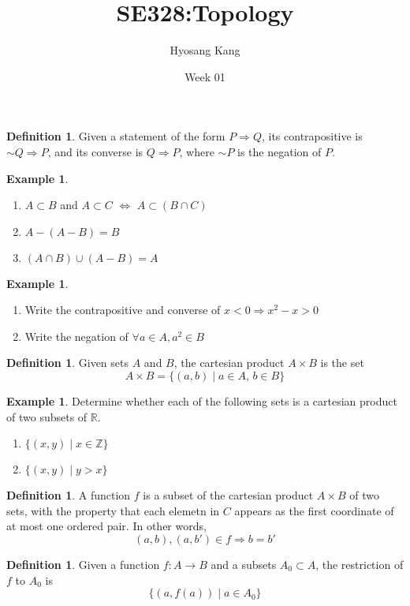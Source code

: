 \documentclass{beamer}
\title[]{SE328:Topology}
\author[]{Hyosang Kang\inst{1}}
\institute[]{\inst{1}Division of Mathematics\\ School of Interdisciplinary Studies\\ DGIST}
\date[]{Week 01}
\theoremstyle{plain}
\theoremstyle{definition}
\newtheorem{defn}[thm]{Definition}
\newtheorem{exmp}[thm]{Example}
\begin{document}
\begin{frame}
\titlepage
\end{frame}

\begin{frame}
\begin{defn}
	Given a statement of the form $P\Rightarrow Q$,
	its contrapositive is $\sim Q\Rightarrow P$,
	and its converse is $Q\Rightarrow P$,
	where $\sim P$ is the negation of $P$.
\end{defn}
\begin{exmp}
	\begin{enumerate}
		\item $A\subset B$ and $A\subset C$ 
		$\Leftrightarrow$ $A\subset(B\cap C)$
		\item $A - (A - B) = B$
		\item $(A\cap B)\cup (A-B) = A$
	\end{enumerate}
\end{exmp}
\begin{exmp}
	\begin{enumerate}
		\item Write the contrapositive and 
		converse of $x<0\Rightarrow x^2-x>0$
		\item Write the negation of
		$\forall a\in A, a^2\in B$
	\end{enumerate}
\end{exmp}
\end{frame}

\begin{frame}
\begin{defn}
	Given sets $A$ and $B$, the cartesian product
	$A\times B$ is the set 
	$$A\times B = \{(a,b)\mid a\in A,\,b\in B\}$$
\end{defn}
\begin{exmp}
	Determine whether each of the following sets is a
	cartesian product of two subsets of $\mathbb R$.
	\begin{enumerate}
		\item $\{(x,y)\mid x\in\mathbb Z\}$
		\item $\{(x,y)\mid y>x\}$ 
	\end{enumerate}
\end{exmp}
\end{frame}

\begin{frame}
\begin{defn}
	A function $f$ is a subset of the cartesian 
	product $A\times B$ of two sets, 
	with the property that
	each elemetn in $C$ appears as the first
	coordinate of at most one ordered pair.
	In other words, 
		$$(a,b), (a,b')\in f\Rightarrow b=b'$$
\end{defn}
\begin{defn}
	Given a function $f:A\to B$ and a subsets
	$A_0\subset A$, 
	the restriction of $f$ to $A_0$ is
	$$\{(a,f(a))\mid a\in A_0\}$$
\end{defn}
\end{frame}
\end{document}
